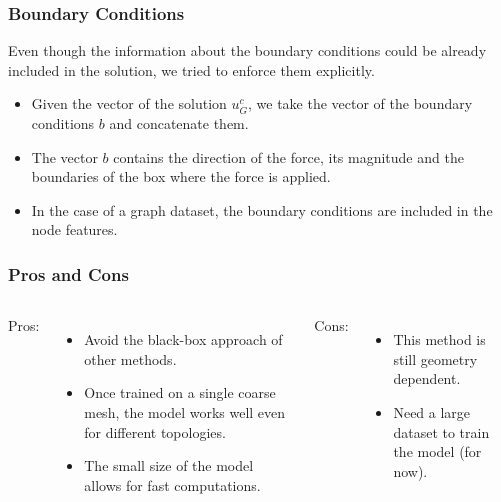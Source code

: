 \documentclass{beamer}
\begin{document}
\begin{frame}
\frametitle{Boundary Conditions}
Even though the information about the boundary conditions could be already included in the solution, we tried to enforce them explicitly.
\begin{itemize}
    \item Given the vector of the solution \( u_G^c \), we take the vector of the boundary conditions \( b \) and concatenate them.
    \item The vector \( b \) contains the direction of the force, its magnitude and the boundaries of the box where the force is applied.
    \item In the case of a graph dataset, the boundary conditions are included in the node features.
    \end{itemize}

\end{frame}


\begin{frame}
\frametitle{Pros and Cons}
\begin{columns}
    Pros:
    \begin{itemize}
        \item Avoid the black-box approach of other methods.
        \item Once trained on a single coarse mesh, the model works well even for different topologies.
        \item The small size of the model allows for fast computations.
    \end{itemize}
    Cons:
    \begin{itemize}
        \item This method is still geometry dependent.
        \item Need a large dataset to train the model (for now).
    \end{itemize}
\end{columns}
\end{frame}
\end{document}

